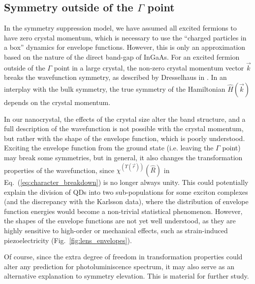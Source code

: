 \subsection{Symmetry outside of the $\Gamma$ point} \label{sec:symmetry_outside_gamma}
In the symmetry suppression model, we have assumed all excited fermions to have zero crystal momentum, which is necessary to use the ``charged particles in a box'' dynamics for envelope functions. However, this is only an approximation based on the nature of the direct band-gap of InGaAs. For an excited fermion outside of the $\Gamma$ point in a large crystal, the non-zero crystal momentum vector $\vec{k}$ breaks the wavefunction symmetry, as described by Dresselhaus in \cite[Ch.~13]{dresselhaus}. In an interplay with the bulk symmetry, the true symmetry of the Hamiltonian $\hat{H}\left(\vec{k}\right)$ depends on the crystal momentum. 

In our nanocrystal, the effects of the crystal size alter the band structure, and a full description of the wavefunction is not possible with the crystal momentum, but rather with the shape of the envelope function, which is poorly understood. Exciting the envelope function from the ground state (i.e. leaving the $\Gamma$ point) may break some symmetries, but in general, it also changes the transformation properties of the wavefunction, since $\chi^{\left(\Upsilon\left(\vec{r}\right)\right)}\left(\hat{R}\right)$ in Eq.~(\ref{eq:character_breakdown}) is no longer always unity. This could potentially explain the division of QDs into two sub-populations for some exciton complexes (and the discrepancy with the Karlsson data), where the distribution of envelope function energies would become a non-trivial statistical phenomenon. However, the shapes of the envelope functions are not yet well understood, as they are highly sensitive to high-order or mechanical effects, such as strain-induced piezoelectricity (Fig.~\ref{fig:lens_envelopes}).

Of course, since the extra degree of freedom in transformation properties could alter any prediction for photoluminiscence spectrum, it may also serve as an alternative explanation to symmetry elevation. This is material for further study.\\
